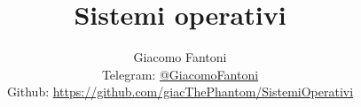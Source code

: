 

\title{\Huge \textbf{Sistemi operativi}}

\author{
  Giacomo Fantoni \\
  \small Telegram: \href{https://t.me/GiacomoFantoni}{@GiacomoFantoni} \\[3pt]
  \small Github: \href{https://github.com/giacThePhantom/SistemiOperativi}{https://github.com/giacThePhantom/SistemiOperativi}}

\maketitle
\tableofcontents






